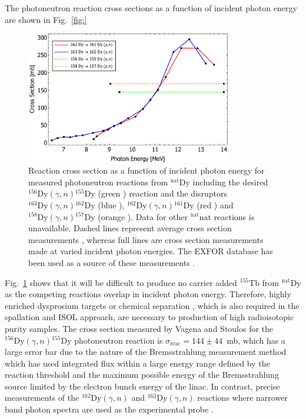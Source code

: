 The photoneutron reaction cross sections as a function of incident photon energy are shown in Fig.~\ref{fig:}
\begin{figure}[!h]
\centering
\includegraphics[width=0.8\textwidth]{Figures/DIANA_Inverse_Compton_Source_Design/DyLandscape.pdf}
\caption{Reaction cross section as a function of incident photon energy for measured photoneutron reactions from $^{\mathrm{nat}}\mathrm{Dy}$ including the desired $^{156}\mathrm{Dy}\left(\gamma,n\right){}^{155}\mathrm{Dy}$ (green \cite{vagena2017photodisintegration}) reaction and the disruptors $^{163}\mathrm{Dy}\left(\gamma,n\right){}^{162}\mathrm{Dy}$ (blue \cite{renstrom2018verification}), $^{162}\mathrm{Dy}\left(\gamma,n\right){}^{161}\mathrm{Dy}$ (red \cite{renstrom2018verification}) and $^{158}\mathrm{Dy}\left(\gamma,n\right){}^{157}\mathrm{Dy}$ (orange \cite{vagena2017photodisintegration}). Data for other $^{\mathrm{nat}}\mathrm{nat}$ reactions is unavailable. Dashed lines represent average cross section measurements \cite{vagena2017photodisintegration}, whereas full lines are cross section measurements made at varied incident photon energies. The EXFOR database has been used as a source of these measurements \cite{zerkin2018experimental}. }
\label{fig:Dy_cross_section_energy)}
\end{figure}

Fig.~\ref{fig:Dy_cross_section_energy)} shows that it will be difficult to produce no carrier added $^{155}\mathrm{Tb}$ from $^{\mathrm{nat}}\mathrm{Dy}$ as the competing reactions overlap in incident photon energy. Therefore, highly enriched dysprosium targets or chemical separation \cite{webster2019chemical}, which is also required in the spallation and ISOL approach, are necessary to production of high radioisotopic purity samples. The cross section measured by Vagena and Stoulos for the $^{156}\mathrm{Dy}\left(\gamma,n\right){}^{155}\mathrm{Dy}$ photoneutron reaction is $\sigma_{\mathrm{reac}} = 144\pm 44$~\si{\milli\barn}, which has a large error bar due to the nature of the Bremsstrahlung measurement method which has used integrated flux  within a large energy range defined by the reaction threshold and the maximum possible energy of the Bremsstrahlung source limited by the electron bunch energy of the linac. In contrast, precise measurements of the $^{162}\mathrm{Dy}\left(\gamma,n\right)$ and $^{163}\mathrm{Dy}\left(\gamma,n\right)$ reactions where narrower band photon spectra are used as the experimental probe \cite{renstrom2018verification}.

